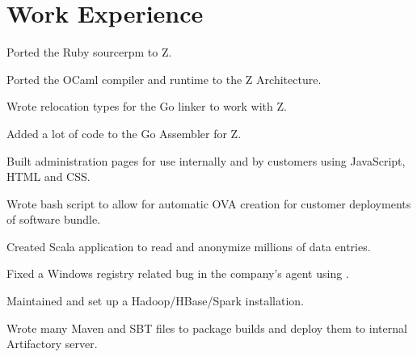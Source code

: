 \documentclass[letterpaper]{deedy-resume-modified} %
\begin{document}
\hfill
%
%
\begin{minipage}[t]{0.66\textwidth} %


\section{Work Experience}


\vspace{\topsep}
\begin{tightitemize}
\item Ported the Ruby sourcerpm to Z.
\item Ported the OCaml compiler and runtime to the Z Architecture.
\item Wrote relocation types for the Go linker to work with Z.
\item Added a lot of code to the Go Assembler for Z.
\end{tightitemize}

\sectionspace %



\begin{tightitemize}
\item Built administration pages for use internally and by customers using JavaScript, HTML and CSS.
\item Wrote bash script to allow for automatic OVA creation for customer deployments of software bundle.
\item Created Scala application to read and anonymize millions of data entries.
\item Fixed a Windows registry related bug in the company's agent using \CPP.
\item Maintained and set up a Hadoop/HBase/Spark installation.
\item Wrote many Maven and SBT files to package builds and deploy them to internal Artifactory server.
\end{tightitemize}


\end{minipage}
\end{document}
